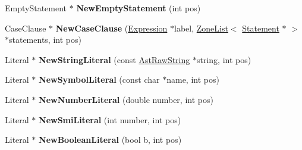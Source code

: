 \begin{DoxyCompactItemize}
\item 
\hypertarget{classv8_1_1internal_1_1_b_a_s_e___e_m_b_e_d_d_e_d_ac1c3f985a8f1873c4bc495dda095d997}{}Empty\+Statement $\ast$ {\bfseries New\+Empty\+Statement} (int pos)\label{classv8_1_1internal_1_1_b_a_s_e___e_m_b_e_d_d_e_d_ac1c3f985a8f1873c4bc495dda095d997}

\item 
\hypertarget{classv8_1_1internal_1_1_b_a_s_e___e_m_b_e_d_d_e_d_a7fad773708214a66d2c1ed0cf44f918c}{}Case\+Clause $\ast$ {\bfseries New\+Case\+Clause} (\hyperlink{classv8_1_1internal_1_1_expression}{Expression} $\ast$label, \hyperlink{classv8_1_1internal_1_1_zone_list}{Zone\+List}$<$ \hyperlink{classv8_1_1internal_1_1_statement}{Statement} $\ast$ $>$ $\ast$statements, int pos)\label{classv8_1_1internal_1_1_b_a_s_e___e_m_b_e_d_d_e_d_a7fad773708214a66d2c1ed0cf44f918c}

\item 
\hypertarget{classv8_1_1internal_1_1_b_a_s_e___e_m_b_e_d_d_e_d_abae2a957303231de6f37a85738b05b2a}{}Literal $\ast$ {\bfseries New\+String\+Literal} (const \hyperlink{classv8_1_1internal_1_1_ast_raw_string}{Ast\+Raw\+String} $\ast$string, int pos)\label{classv8_1_1internal_1_1_b_a_s_e___e_m_b_e_d_d_e_d_abae2a957303231de6f37a85738b05b2a}

\item 
\hypertarget{classv8_1_1internal_1_1_b_a_s_e___e_m_b_e_d_d_e_d_ad11006c3217b7ba7d872631cfad431f3}{}Literal $\ast$ {\bfseries New\+Symbol\+Literal} (const char $\ast$name, int pos)\label{classv8_1_1internal_1_1_b_a_s_e___e_m_b_e_d_d_e_d_ad11006c3217b7ba7d872631cfad431f3}

\item 
\hypertarget{classv8_1_1internal_1_1_b_a_s_e___e_m_b_e_d_d_e_d_a553def29f8d0bd61164e26748cb2b910}{}Literal $\ast$ {\bfseries New\+Number\+Literal} (double number, int pos)\label{classv8_1_1internal_1_1_b_a_s_e___e_m_b_e_d_d_e_d_a553def29f8d0bd61164e26748cb2b910}

\item 
\hypertarget{classv8_1_1internal_1_1_b_a_s_e___e_m_b_e_d_d_e_d_a70fa503b33cf286c872ff219d4f6b366}{}Literal $\ast$ {\bfseries New\+Smi\+Literal} (int number, int pos)\label{classv8_1_1internal_1_1_b_a_s_e___e_m_b_e_d_d_e_d_a70fa503b33cf286c872ff219d4f6b366}

\item 
\hypertarget{classv8_1_1internal_1_1_b_a_s_e___e_m_b_e_d_d_e_d_a37efdc204e16329f90aea21fc5259e63}{}Literal $\ast$ {\bfseries New\+Boolean\+Literal} (bool b, int pos)\label{classv8_1_1internal_1_1_b_a_s_e___e_m_b_e_d_d_e_d_a37efdc204e16329f90aea21fc5259e63}


\end{DoxyCompactItemize}
